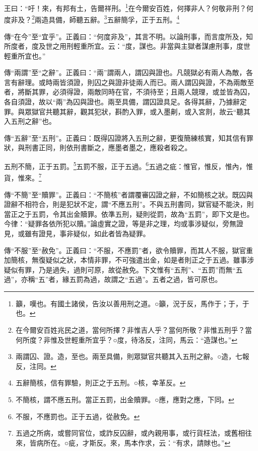 王曰：“吁！來，有邦有土，告爾祥刑。\footnote{籲，嘆也。有國土諸侯，告汝以善用刑之道。○籲，況于反，馬作于；于，于也。}在今爾安百姓，何擇非人？何敬非刑？何度非及？\footnote{在今爾安百姓兆民之道，當何所擇？非惟吉人乎？當何所敬？非惟五刑乎？當何所度？非惟及世輕重所宜乎？○度，待洛反，注同，馬云：“造謀也。”}兩造具備，師聽五辭。\footnote{兩謂囚、證。造，至也。兩至具備，則眾獄官共聽其入五刑之辭。○造，七報反，注同。}五辭簡孚，正于五刑。\footnote{五辭簡核，信有罪驗，則正之于五刑。○核，幸革反。}


{\noindent\zhuan{}\fzbyks 傳“在今”至“宜乎”。正義曰：“何度非及”，其言不明。以論刑事，而言度所及，知所度者，度及世之用刑輕重所宜。云：“度，謀也。非當與主獄者謀慮刑事，度世輕重所宜也。” \par}

{\noindent\zhuan{}\fzbyks 傳“兩謂”至“之辭”。正義曰：“兩”謂兩人，謂囚與證也。凡競獄必有兩人為敵，各言有辭理。或時兩皆須證，則囚之與證非徒兩人而已。兩人謂囚與證，不為兩敵至者，將斷其罪，必須得證，兩敵同時在官，不須待至；且兩人競理，或並皆為囚，各自須證，故以“兩”為囚與證也。兩至具備，謂囚證具足。各得其辭，乃據辭定罪。與眾獄官共聽其辭，觀其犯狀，斟酌入罪，或入墨劓，或入宮剕，故云“聽其入五刑之辭”也。 \par}

{\noindent\zhuan{}\fzbyks 傳“五辭”至“五刑”。正義曰：既得囚證將入五刑之辭，更復簡練核實，知其信有罪狀，與刑書正同，則依刑書斷之，應墨者墨之，應殺者殺之。 \par}

五刑不簡，正于五罰。\footnote{不簡核，謂不應五刑。當正五罰，出金贖罪。○應，應對之應，下同。}五罰不服，正于五過。\footnote{不服，不應罰也。正于五過，從赦免。}五過之疵：惟官，惟反，惟內，惟貨，惟來。\footnote{五過之所病，或嘗同官位，或詐反囚辭，或內親用事，或行貨枉法，或舊相往來，皆病所在。○疵，才斯反。來，馬本作求，云：“有求，請賕也。”}


{\noindent\zhuan{}\fzbyks 傳“不簡”至“贖罪”。正義曰：“不簡核”者謂覆審囚證之辭，不如簡核之狀。既囚與證辭不相符合，則是犯狀不定，謂“不應五刑”。不與五刑書同，獄官疑不能決，則當正之于五罰，令其出金贖罪。依準五刑，疑則從罰，故為“五罰”，即下文是也。今律：“疑罪各依所犯以贖。”論虛實之證，等是非之理，均或事涉疑似，旁無證見，或雖有證見，事非疑似，如此者皆為疑罪。 \par}

{\noindent\zhuan{}\fzbyks 傳“不服”至“赦免”。正義曰：“不服，不應罰”者，欲令贖罪，而其人不服，獄官重加簡核，無復疑似之狀，本情非罪，不可強遣出金，如是者則正之于五過。雖事涉疑似有罪，乃是過失，過則可原，故從赦免。下文惟有“五刑”、“五罰”而無“五過”，亦稱“五”者，緣五罰為過，故謂之“五過”。五者之過，皆可原也。 \par}

